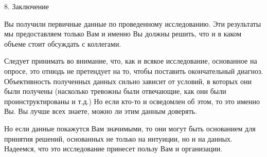 \begin{frame}{8. Заключение}

\tiny 
Вы получили первичные данные по проведенному исследованию. Эти результаты мы предоставляем только Вам и именно Вы должны решить, что и в каком объеме стоит обсуждать с коллегами. 
\smallskip

Следует принимать во внимание, что, как и всякое исследование, основанное на опросе, это отнюдь не претендует на то, чтобы поставить окончательный диагноз. Объективность полученных данных сильно зависит от условий, в которых они были получены (насколько тревожны были отвечающие, как они были проинструктированы и т.д.) Но если кто-то и осведомлен об этом, то это именно Вы.  Вы лучше всех знаете, можно ли этим данным доверять.
\smallskip

Но  если данные покажутся Вам значимыми, то они могут быть основанием для принятия решений, основанных не только на интуиции, но и на данных. Надеемся, что это исследование принесет пользу Вам и организации.


\end{frame}


